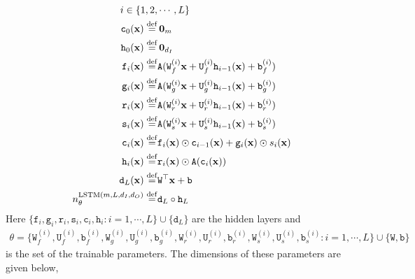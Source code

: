 \begin{align}
    i\in\{1,2,&\cdots, L\}\\
    \mathtt c_0(\mathbf x)\stackrel{\rm def}{=}&\,\mathbf 0_m\label{eq:layer-c0--var-ml}\\
    \mathtt h_0(\mathbf x)\stackrel{\rm def}{=}&\,\mathbf 0_{d_I}\label{eq:layer-h0--var-ml}\\
    \mathtt f_i(\mathbf x) \stackrel{\rm def}{=}& \mathtt A(\mathtt W_f^{(i)}\mathbf x + \mathtt U_f^{(i)}\mathtt h_{i-1}(\mathbf x) + \mathtt b_f^{(i)})\label{eq:layer-f--var-ml}\\
    \mathtt g_i(\mathbf x) \stackrel{\rm def}{=}& \mathtt A(\mathtt W_g^{(i)}\mathbf x + \mathtt U_g^{(i)}\mathtt h_{i-1}(\mathbf x) + \mathtt b_g^{(i)})\label{eq:layer-g--var-ml}\\
    \mathtt r_i(\mathbf x) \stackrel{\rm def}{=}& \mathtt A(\mathtt W_r^{(i)}\mathbf x + \mathtt U_r^{(i)}\mathtt h_{i-1}(\mathbf x) + \mathtt b_r^{(i)})\label{eq:layer-r--var-ml}\\
    \mathtt s_i(\mathbf x) \stackrel{\rm def}{=}& \mathtt A(\mathtt W_s^{(i)}\mathbf x + \mathtt U_s^{(i)}\mathtt h_{i-1}(\mathbf x) + \mathtt b_s^{(i)})\label{eq:layer-s--var-ml}\\
    \mathtt c_i(\mathbf x) \stackrel{\rm def}{=}&  \mathtt f_i(\mathbf x)\odot \mathtt c_{i-1}(\mathbf x) + \mathtt g_i(\mathbf x)\odot s_i(\mathbf x)\label{eq:layer-c--var-ml}\\
    \mathtt h_i(\mathbf x) \stackrel{\rm def}{=}& \mathtt r_i(\mathbf x)\odot \mathtt A(\mathtt c_i(\mathbf x))\label{eq:layer-h--var-ml}\\
    \mathtt d_L(\mathbf x)\stackrel{\rm def}{=}&\mathtt W^\top\mathbf x + \mathtt b\label{eq:layer-final--var-ml}\\
    n^{{\rm LSTM}(m, L, d_I, d_O)}_\theta \stackrel{\rm def}{=}& \mathtt d_L\circ \mathtt h_L\label{eq:def-LSTM--var-ml} 
\end{align}
Here $\{\mathtt f_i, \mathtt g_i, \mathtt r_i, \mathtt s_i, \mathtt c_i, \mathtt h_i: i=1,\cdots,L\}\cup\{\mathtt d_L\}$ are the hidden layers and
\begin{align}
    \theta=\{\mathtt W_f^{(i)}, \mathtt U_f^{(i)}, \mathtt b_f^{(i)}, \mathtt W_g^{(i)}, \mathtt U_g^{(i)}, \mathtt b_g^{(i)}, \mathtt W_r^{(i)}, \mathtt U_r^{(i)}, \mathtt b_r^{(i)}, \mathtt W_s^{(i)}, \mathtt U_s^{(i)}, \mathtt b_s^{(i)}:
i=1,\cdots,L\}\cup\{\mathtt W, \mathtt b\}\label{eq:theta-composition--var-ml}
\end{align}is the set of the trainable parameters. The dimensions of these parameters are given below,
